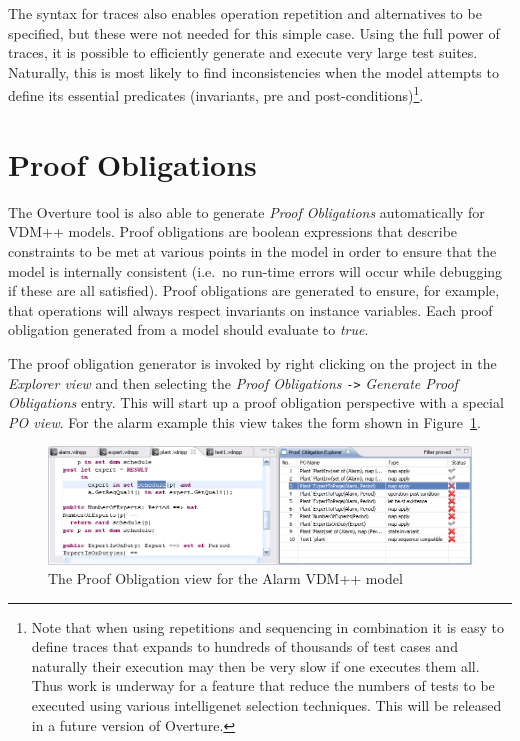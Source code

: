 The syntax for traces also enables operation repetition and alternatives to be
specified, but these were not needed for this simple case. Using the full power
of traces, it is possible to efficiently generate and execute very large test
suites. Naturally, this is most likely to find inconsistencies when the model
attempts to define its essential predicates (invariants, pre and
post-conditions)\footnote{Note that when using repetitions and
  sequencing in combination it is easy to define traces that expands
  to hundreds of thousands of test cases and naturally their execution
  may then be very slow if one executes them all. Thus work is
  underway for a feature that reduce the numbers of tests to be
  executed using various intelligenet selection techniques. This will
  be released in a future version of Overture.}.

\section{Proof Obligations}\label{sec:PO}

The Overture tool is also able to generate \emph{Proof Obligations}
automatically for VDM++ models. Proof obligations are boolean
expressions that describe constraints to be met at various points in
the model in order to ensure that the model is internally consistent
(i.e.\ no run-time errors will occur while debugging if these are all
satisfied). Proof obligations are generated to ensure, for example,
that operations will always respect invariants on instance
variables. Each proof obligation generated from a model should
evaluate to \emph{true}.

The proof obligation generator is invoked by right clicking on the
project in the \emph{Explorer view} and then selecting the \emph{Proof
  Obligations} \texttt{->} \emph{Generate Proof Obligations}
entry. This will start up a proof obligation perspective with a
special \emph{PO view}. For the alarm example this view takes the form
shown in Figure~\ref{fig:POview}.

\begin{figure}[htbp]
\begin{center}
\includegraphics[width=4.5in]{figures/POview}
\caption{The Proof Obligation view for the Alarm VDM++ model\label{fig:POview}}
\end{center}
\end{figure}

